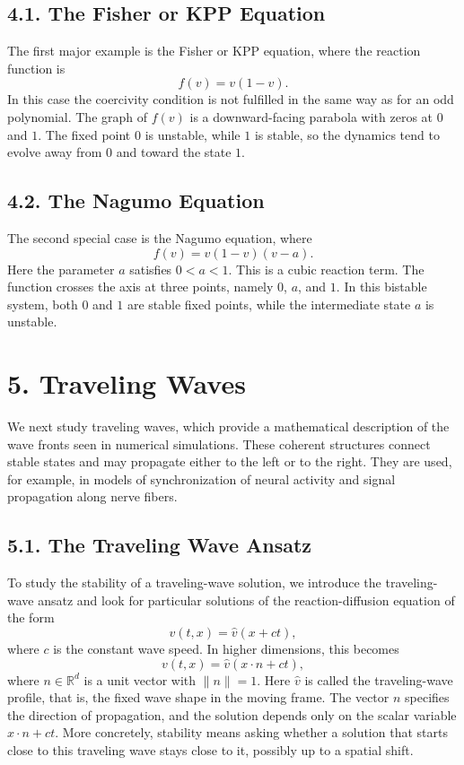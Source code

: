 \documentclass[11pt]{article}
\theoremstyle{definition}
\theoremstyle{remark}
\begin{document}
\subsection*{4.1. The Fisher or KPP Equation}
The first major example is the Fisher or KPP equation, where the reaction function is
\[
f(v)=v(1-v).
\]
In this case the coercivity condition is not fulfilled in the same way as for an odd polynomial. The graph of $f(v)$ is a downward-facing parabola with zeros at $0$ and $1$. The fixed point $0$ is unstable, while $1$ is stable, so the dynamics tend to evolve away from $0$ and toward the state $1$.

\subsection*{4.2. The Nagumo Equation}
The second special case is the Nagumo equation, where
\[
f(v)=v(1-v)(v-a).
\]
Here the parameter $a$ satisfies $0<a<1$. This is a cubic reaction term. The function crosses the axis at three points, namely $0$, $a$, and $1$. In this bistable system, both $0$ and $1$ are stable fixed points, while the intermediate state $a$ is unstable.

\section*{5. Traveling Waves}
We next study traveling waves, which provide a mathematical description of the wave fronts seen in numerical simulations. These coherent structures connect stable states and may propagate either to the left or to the right. They are used, for example, in models of synchronization of neural activity and signal propagation along nerve fibers.

\subsection*{5.1. The Traveling Wave Ansatz}
To study the stability of a traveling-wave solution, we introduce the traveling-wave ansatz and look for particular solutions of the reaction-diffusion equation of the form
\[
v(t,x)=\hat v(x+ct),
\]
where $c$ is the constant wave speed. In higher dimensions, this becomes
\[
v(t,x)=\hat v(x\cdot n+ct),
\]
where $n\in\mathbb R^d$ is a unit vector with $\|n\|=1$. Here $\hat v$ is called the traveling-wave profile, that is, the fixed wave shape in the moving frame. The vector $n$ specifies the direction of propagation, and the solution depends only on the scalar variable $x\cdot n+ct$. More concretely, stability means asking whether a solution that starts close to this traveling wave stays close to it, possibly up to a spatial shift.
\end{document}
